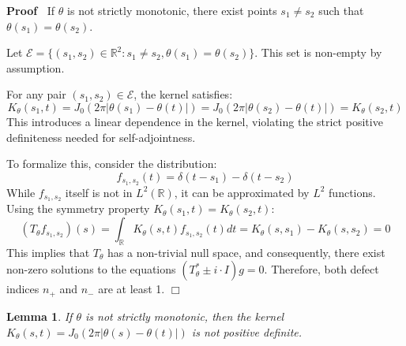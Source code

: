 \documentclass{article}
\newenvironment{proof}{\noindent\textbf{Proof\ }}{\hspace*{\fill}$\Box$\medskip}
\newtheorem{lemma}{Lemma}
\begin{document}
\begin{proof}
  If $\theta$ is not strictly monotonic, there exist points $s_1 \neq s_2$
  such that $\theta (s_1) = \theta (s_2)$.
  
  Let $\mathcal{E}= \{(s_1, s_2) \in \mathbb{R}^2 : s_1 \neq s_2, \theta (s_1)
  = \theta (s_2)\}$. This set is non-empty by assumption.
  
  For any pair $(s_1, s_2) \in \mathcal{E}$, the kernel satisfies:
  \begin{equation}
    K_{\theta} (s_1, t) = J_0  (2 \pi | \theta (s_1) - \theta (t) |) = J_0  (2
    \pi | \theta (s_2) - \theta (t) |) = K_{\theta} (s_2, t)
  \end{equation}
  This introduces a linear dependence in the kernel, violating the strict
  positive definiteness needed for self-adjointness.
  
  To formalize this, consider the distribution:
  \begin{equation}
    f_{s_1, s_2} (t) = \delta (t - s_1) - \delta (t - s_2)
  \end{equation}
  While $f_{s_1, s_2}$ itself is not in $L^2 (\mathbb{R})$, it can be
  approximated by $L^2$ functions. Using the symmetry property $K_{\theta}
  (s_1, t) = K_{\theta} (s_2, t)$:
  \begin{equation}
    (T_{\theta} f_{s_1, s_2}) (s) = \int_{\mathbb{R}} K_{\theta} (s, t)
    f_{s_1, s_2} (t) dt = K_{\theta} (s, s_1) - K_{\theta} (s, s_2) = 0
  \end{equation}
  This implies that $T_{\theta}$ has a non-trivial null space, and
  consequently, there exist non-zero solutions to the equations
  $(T_{\theta}^{\ast} \pm i \cdot I) g = 0$. Therefore, both defect indices
  $n_+$ and $n_-$ are at least 1.
\end{proof}

\begin{lemma}
  \label{lemma:nonmonotonic-not-pd}If $\theta$ is not strictly monotonic, then
  the kernel $K_{\theta} (s, t) = J_0  (2 \pi | \theta (s) - \theta (t) |)$ is
  not positive definite.
\end{lemma}
\end{document}
